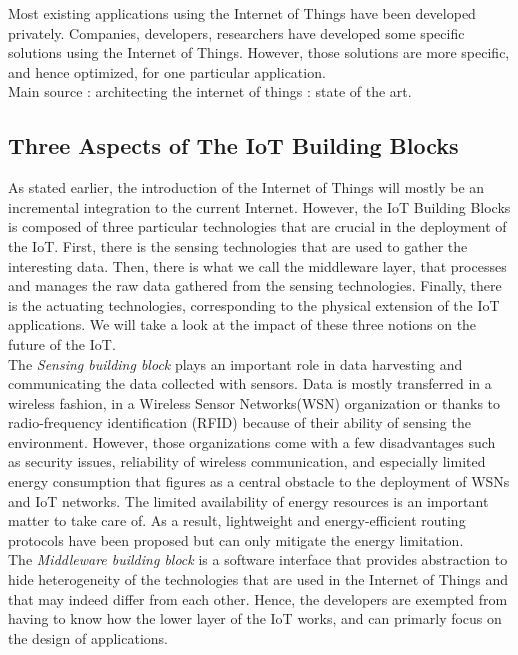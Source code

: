 Most existing applications using the Internet of Things have been developed privately. Companies, developers, researchers have developed some specific solutions using the Internet of Things. However, those solutions are more specific, and hence optimized, for one particular application.\\


Main source : architecting the internet of things : state of the art.\\

\subsection{Three Aspects of The IoT Building Blocks}

As stated earlier, the introduction of the Internet of Things will mostly be an incremental integration to the current Internet. However, the IoT Building Blocks is composed of three particular technologies that are crucial in the deployment of the IoT. First, there is the sensing technologies that are used to gather the interesting data. Then, there is what we call the middleware layer, that processes and manages the raw data gathered from the sensing technologies. Finally, there is the actuating technologies, corresponding to the physical extension of the IoT applications. We will take a look at the impact of these three notions on the future of the IoT.\\

The \textit{Sensing building block} plays an important role in data harvesting and communicating the data collected with sensors. Data is mostly transferred in a wireless fashion, in a Wireless Sensor Networks(WSN) organization or thanks to radio-frequency identification (RFID) because of their ability of sensing the environment. However, those organizations come with a few disadvantages such as security issues, reliability of wireless communication, and especially limited energy consumption that figures as a central obstacle to the deployment of WSNs and IoT networks. The limited availability of energy resources is an important matter to take care of. As a result, lightweight and energy-efficient routing protocols have been proposed but can only mitigate the energy limitation. \\

The \textit{Middleware building block} is a software interface that provides abstraction to hide heterogeneity of the technologies that are used in the Internet of Things and that may indeed differ from each other. Hence, the developers are exempted from having to know how the lower layer of the IoT works, and can primarly focus on the design of applications. \\

